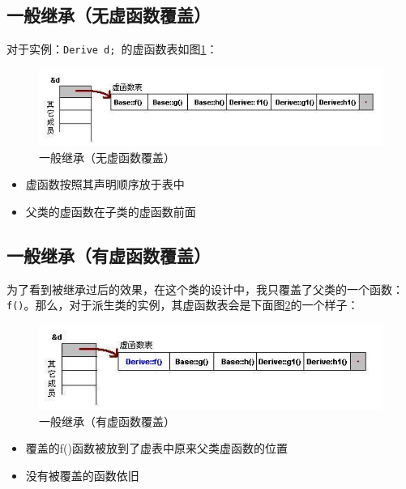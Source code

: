 \documentclass[UTF8,a4paper,12pt]{ctexbook} %
\begin{document}
      \subsection{一般继承（无虚函数覆盖）}
	      对于实例：\verb|Derive d;| 的虚函数表如图\ref{vir-no}：
	      
		      \begin{figure}[h]
		      	\centering
		      	\includegraphics[scale=0.8]{vt-base.jpg}
		      	\caption{一般继承（无虚函数覆盖）\label{vir-no}}
		      \end{figure}
		     
		     \begin{itemize}
		     	\item 虚函数按照其声明顺序放于表中
		     	\item 父类的虚函数在子类的虚函数前面
		     \end{itemize}
      \subsection{一般继承（有虚函数覆盖）}
        为了看到被继承过后的效果，在这个类的设计中，我只覆盖了父类的一个函数：\verb|f()|。那么，对于派生类的实例，其虚函数表会是下面图\ref{vir-yes}的一个样子：
        
	         \begin{figure}[h]
	         	\centering
	         	\includegraphics[scale=0.8]{vt-base2.jpg}
	         	\caption{一般继承（有虚函数覆盖）\label{vir-yes}}
	         \end{figure}
	         
	         \begin{itemize}
	         	\item 覆盖的f()函数被放到了虚表中原来父类虚函数的位置
	         	\item 没有被覆盖的函数依旧
	         \end{itemize}
	         
\end{document}
